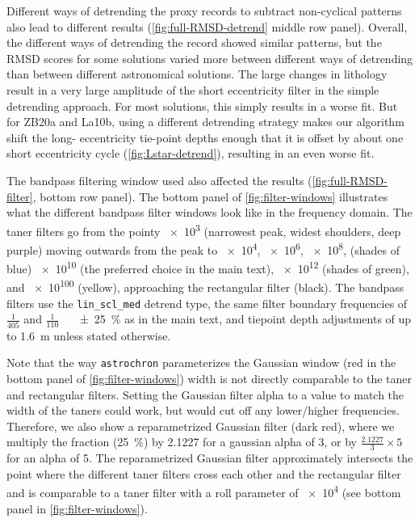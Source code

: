 \documentclass[]{agujournal2019}
\begin{document}
Different ways of detrending the proxy records to subtract non-cyclical patterns also lead to different results (\cref{fig:full-RMSD-detrend} middle row panel).
Overall, the different ways of detrending the record showed similar patterns, but the \gls{RMSD} scores for some solutions varied more between different ways of detrending than between different astronomical solutions.
The large changes in lithology result in a very large amplitude of the short eccentricity filter in the simple detrending approach.
For most solutions, this simply results in a worse fit.
But for ZB20a and La10b, using a different detrending strategy makes our algorithm shift the long- eccentricity tie-point depths enough that it is offset by about one short eccentricity cycle (\cref{fig:Lstar-detrend}), resulting in an even worse fit.

The bandpass filtering window used also affected the results (\cref{fig:full-RMSD-filter}, bottom row panel).
The bottom panel of \cref{fig:filter-windows} illustrates what the different bandpass filter windows look like in the frequency domain.
The taner filters go from the pointy \num{e3} (narrowest peak, widest shoulders, deep purple)
moving outwards from the peak to \num{e4}, \num{e6}, \num{e8}, (shades of blue)
\num{e10} (the preferred choice in the main text),
\num{e12} (shades of green), and \num{e100} (yellow),
approaching the rectangular filter (black).
The bandpass filters use the \texttt{lin\_scl\_med} detrend type,
the same filter boundary frequencies of \(\frac{1}{405}\) and \(\frac{1}{110}\)~\si[per-mode=power]{\per\kiloyear} \qty{\pm25}{\percent} as in the main text,
and tiepoint depth adjustments of up to \qty{1.6}{\metre} unless stated otherwise.

Note that the way \texttt{astrochron} parameterizes the Gaussian window (red in the bottom panel of \cref{fig:filter-windows}) width is not directly comparable to the taner and rectangular filters.
Setting the Gaussian filter alpha to a value to match the width of the taners could work, but would cut off any lower/higher frequencies.
Therefore, we also show a reparametrized Gaussian filter (dark red),
where we multiply the fraction (\qty{25}{\percent})
by \num{2.1227} for a gaussian alpha of 3,
or by \(\frac{2.1227}{3}\times5\) for an alpha of 5.
The reparametrized Gaussian filter approximately intersects the point where the different taner filters cross each other and the rectangular filter and is comparable to a taner filter with a roll parameter of \num{e4} (see bottom panel in \cref{fig:filter-windows}).
\end{document}

